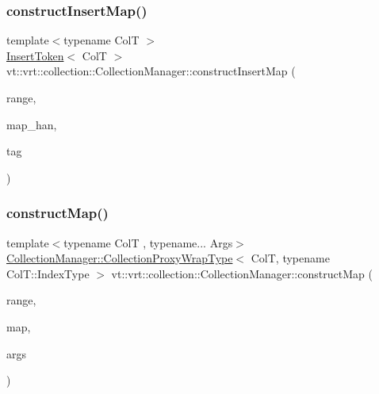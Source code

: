 \mbox{\label{structvt_1_1vrt_1_1collection_1_1_collection_manager_a5fdc620b8c03bf7748802e35cff1afe9}} 
\subsubsection{\texorpdfstring{construct\+Insert\+Map()}{constructInsertMap()}}
{\footnotesize\ttfamily template$<$typename ColT $>$ \\
\hyperlink{structvt_1_1vrt_1_1collection_1_1_insert_token}{Insert\+Token}$<$ ColT $>$ vt\+::vrt\+::collection\+::\+Collection\+Manager\+::construct\+Insert\+Map (\begin{DoxyParamCaption}\item[{typename Col\+T\+::\+Index\+Type}]{range,  }\item[{\hyperlink{namespacevt_af64846b57dfcaf104da3ef6967917573}{Handler\+Type} const \&}]{map\+\_\+han,  }\item[{\hyperlink{namespacevt_a84ab281dae04a52a4b243d6bf62d0e52}{Tag\+Type} const \&}]{tag }\end{DoxyParamCaption})}

\mbox{\label{structvt_1_1vrt_1_1collection_1_1_collection_manager_a07aebc3fa25e2fe901eedc5db722655f}} 
\subsubsection{\texorpdfstring{construct\+Map()}{constructMap()}}
{\footnotesize\ttfamily template$<$typename ColT , typename... Args$>$ \\
\hyperlink{structvt_1_1vrt_1_1collection_1_1_collection_manager_a56458ed7f9bb22b631b9b3a745f42f94}{Collection\+Manager\+::\+Collection\+Proxy\+Wrap\+Type}$<$ ColT, typename Col\+T\+::\+Index\+Type $>$ vt\+::vrt\+::collection\+::\+Collection\+Manager\+::construct\+Map (\begin{DoxyParamCaption}\item[{typename Col\+T\+::\+Index\+Type}]{range,  }\item[{\hyperlink{namespacevt_af64846b57dfcaf104da3ef6967917573}{Handler\+Type} const \&}]{map,  }\item[{Args \&\&...}]{args }\end{DoxyParamCaption})}

